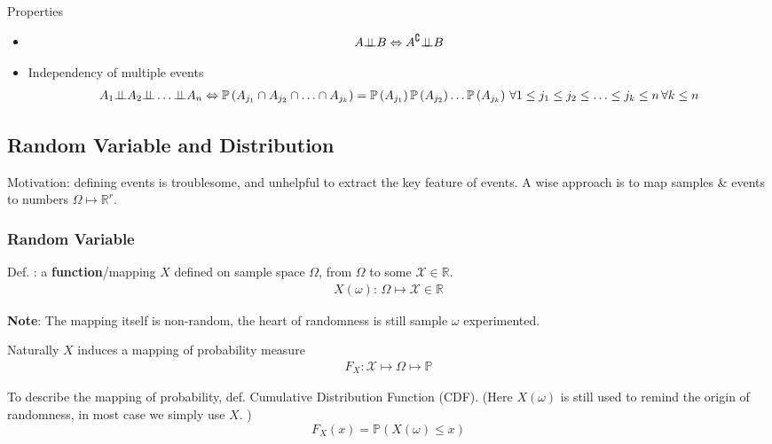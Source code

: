     Properties
    \begin{itemize}[topsep=2pt,itemsep=0pt]
        \item 
        \begin{align}
            A\bot\!\!\!\bot B\Leftrightarrow A^\complement \bot\!\!\!\bot B 
        \end{align}
        \item Independency of multiple events
        \begin{align}
            A_1\independent A_2\independent\ldots \independent A_n \Leftrightarrow \mathbb{P}\left( A_{j_1}\cap A_{j_2}\cap\ldots\cap A_{j_k} \right)=\mathbb{P}\left( A_{j_1} \right) \mathbb{P}\left( A_{j_2} \right) \ldots \mathbb{P}\left( A_{j_k} \right)   \,\forall 1\leq j_1\leq j_2\leq \ldots \leq j_k\leq n\,\forall k\leq n
        \end{align}
    \end{itemize}
    
        

\subsection{Random Variable and Distribution}\label{SectionPropertiesOfRandomVariableAndVector}

Motivation: defining events is troublesome, and unhelpful to extract the key feature of events. A wise approach is to map samples \& events to numbers $ \Omega \mapsto \mathbb{R}^r $.

\subsubsection{Random Variable}
    Def. : a \textbf{function}/mapping $X$ defined on sample space $\Omega$,  from $\Omega$ to some $\mathscr{X}\in\mathbb{R} $.
    \begin{align}
        X(\omega ):\, \Omega \mapsto \mathscr{X}\in\mathbb{R} 
    \end{align}

    \textbf{Note}: The mapping itself is non-random, the heart of randomness is still sample $ \omega  $ experimented. 

    Naturally $ X $ induces a mapping of probability measure
    \begin{align}
        F_X: \mathscr{X} \mapsto \Omega \mapsto \mathbb{P} 
    \end{align}

    To describe the mapping of probability, def. Cumulative Distribution Function (CDF). (Here $ X(\omega ) $ is still used to remind the origin of randomness, in most case we simply use $ X $. )
    \begin{equation}
        F_X(x)=\mathbb{P} (X(\omega )\leq x)
    \end{equation}



